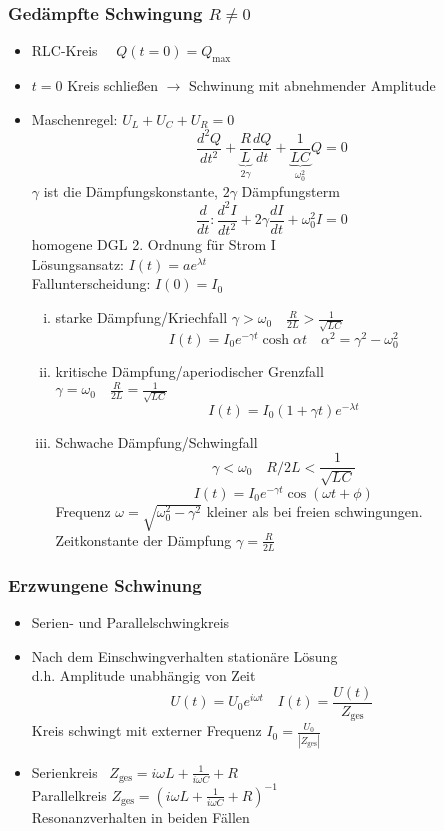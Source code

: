 \documentclass[titlepage,12pt,a4paper,ngerman]{report}
\newcommand{\tx}[1]{\textrm{#1}}
\newcommand{\ub}[1]{\underbrace{#1}}
\begin{document}
 \subsubsection{Gedämpfte Schwingung $ R \neq 0 $}
 \begin{itemize}
 	\item RLC-Kreis $ \quad Q(t=0) = Q_{\tx{max}} $
 	\item $ t=0 $ Kreis schließen $ \rightarrow $ Schwinung mit abnehmender Amplitude
 	\item Maschenregel: $ U_L + U_C + U_R = 0 $\\
 	$$\frac{d^2 Q}{dt^2} + \ub{\frac{R}{L}}_{2 \gamma} \frac{dQ}{dt} + \ub{\frac{1}{LC}}_{\omega^2_0} Q = 0 $$
 	$ \gamma $ ist die Dämpfungskonstante, $ 2 \gamma $ Dämpfungsterm
 	$$ \frac{d}{dt} : \frac{d^2I}{dt^2} + 2 \gamma \frac{dI}{dt} + \omega^2_0 I = 0 $$
 	homogene DGL 2. Ordnung für Strom I\\
 	Lösungsansatz: $ I(t) = a e ^{\lambda t} $\\
 	Fallunterscheidung: $ I(0) = I_0 $
 	\begin{enumerate}[i)]
 		\item starke Dämpfung/Kriechfall $ \gamma > \omega_0 \quad \frac{R}{2L} > \frac{1}{\sqrt{LC}} $\\
 		$$ I(t) = I_0 e^{-\gamma t} \cosh \alpha t \quad \alpha^2 = \gamma^2 - \omega^2_0 $$
 		\item kritische Dämpfung/aperiodischer Grenzfall\\
 		$ \gamma = \omega_0 \quad \frac{R}{2L} = \frac{1}{\sqrt{LC}} $\\
 		$$ I(t) = I_0 (1+\gamma t) e ^{-\lambda t} $$
 		\item Schwache Dämpfung/Schwingfall
 		$$\gamma < \omega_0 \quad R/2L < \frac{1}{\sqrt{LC}}$$
 		$$I(t) = I_0 e^{-\gamma t} \cos (\omega t + \phi)$$
 		Frequenz $\omega = \sqrt{\omega_0^2 - \gamma^2}$ kleiner als bei freien schwingungen.\\
 		Zeitkonstante der Dämpfung $\gamma = \frac{R}{2L}$
 	\end{enumerate}
 \end{itemize}
 \subsubsection{Erzwungene Schwinung}
 \begin{itemize}
 	\item Serien- und Parallelschwingkreis
 	\item Nach dem Einschwingverhalten stationäre Lösung\\
 	d.h. Amplitude unabhängig von Zeit
 	$$U(t) = U_0 e^{i\omega t} \quad I(t) = \frac{U(t)}{Z_{\tx{ges}}} $$
 	Kreis schwingt mit externer Frequenz $ I_0 = \frac{U_0}{|Z_{\tx{ges}}|} $
 	\item Serienkreis $\ \; Z_{\tx{ges}} = i \omega L + \frac{1}{i \omega C} + R $\\
 	Parallelkreis $ Z_{\tx{ges}} = (i \omega L + \frac{1}{i \omega C} + R)^{-1} $\\
 	Resonanzverhalten in beiden Fällen
 \end{itemize}
\end{document}
